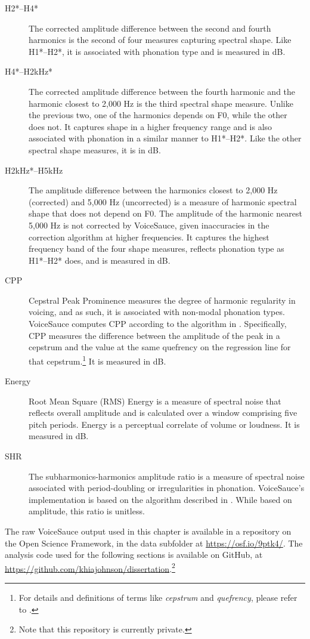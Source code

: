 \begin{description}
    \item[H2*--H4*] The corrected amplitude difference between the second and fourth harmonics is the second of four measures capturing spectral shape. Like H1*--H2*, it is associated with phonation type and is measured in dB.
    \item[H4*--H2kHz*] The corrected amplitude difference between the fourth harmonic and the harmonic closest to 2,000 Hz is the third spectral shape measure. Unlike the previous two, one of the harmonics depends on F0, while the other does not. It captures shape in a higher frequency range and is also associated with phonation in a similar manner to H1*--H2*. Like the other spectral shape measures, it is in dB.
    \item[H2kHz*--H5kHz] The amplitude difference between the harmonics closest to 2,000 Hz (corrected) and 5,000 Hz (uncorrected) is a measure of harmonic spectral shape that does not depend on F0. The amplitude of the harmonic nearest 5,000 Hz is not corrected by VoiceSauce, given inaccuracies in the correction algorithm at higher frequencies. It captures the highest frequency band of the four shape measures, reflects phonation type as H1*--H2* does, and is measured in dB.
    \item[CPP] Cepstral Peak Prominence measures the degree of harmonic regularity in voicing, and as such, it is associated with non-modal phonation types. VoiceSauce computes CPP according to the algorithm in \citet{hillenbrand_1994_acoustic}. Specifically, CPP measures the difference between the amplitude of the peak in a cepstrum and the value at the same quefrency on the regression line for that cepstrum.\footnote{For details and definitions of terms like \textit{cepstrum} and \textit{quefrency}, please refer to \citet{hillenbrand_1994_acoustic}.} It is measured in dB.
    \item[Energy] Root Mean Square (RMS) Energy is a measure of spectral noise that reflects overall amplitude and is calculated over a window comprising five pitch periods. Energy is a perceptual correlate of volume or loudness. It is measured in dB.
    \item[SHR] The subharmonics-harmonics amplitude ratio is a measure of spectral noise associated with period-doubling or irregularities in phonation. VoiceSauce's implementation is based on the algorithm described in \cite{sun_2002_shr}. While based on amplitude, this ratio is unitless. 
\end{description}

The raw VoiceSauce output used in this chapter is available in a repository on the Open Science Framework, in the data subfolder at \url{https://osf.io/9ptk4/}. The analysis code used for the following sections is available on GitHub, at \url{https://github.com/khiajohnson/dissertation}.\footnote{Note that this repository is currently private.}

